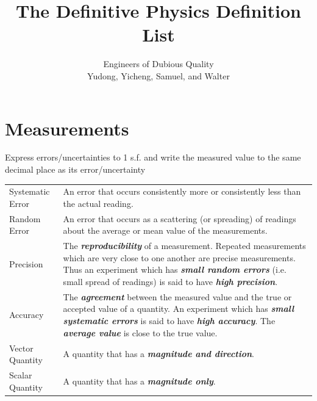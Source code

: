 \documentclass[a4paper,11pt]{article}
\title{The Definitive Physics Definition List}
\author{Engineers of Dubious Quality\\Yudong, Yicheng, Samuel, and Walter}
\begin{document}
	
	\maketitle
	
	\section{Measurements}
	Express errors/uncertainties to 1 s.f. and write the measured value to the same decimal place as its error/uncertainty
	
	\begin{center}
		\renewcommand{\arraystretch}{1.2}
		\begin{tabular}{@{} l p{11.6cm} @{}}
			\toprule
			Systematic Error & An error that occurs consistently more or consistently less than the actual reading.\\
			Random Error & An error that occurs as a scattering (or spreading) of readings about the average or mean value of the measurements. \\
			\midrule
			Precision & The \textit{\textbf{reproducibility}} of a measurement. Repeated measurements which are very close to one another are precise measurements. Thus an experiment which has \textit{\textbf{small random errors}} (i.e. small spread of readings) is said to have \textit{\textbf{high precision}}. \\
			Accuracy & The \textbf{\textit{agreement}} between the measured value and the true or accepted value of a quantity. An experiment which has \textbf{\textit{small systematic errors}} is said to have \textbf{\textit{high accuracy}}. The \textbf{\textit{average value}} is close to the true value. \\
			\midrule
			Vector Quantity & A quantity that has a \textbf{\textit{magnitude and direction}}. \\
			Scalar Quantity & A quantity that has a \textbf{\textit{magnitude only}}. \\
			\bottomrule
		\end{tabular}
	\end{center}
	
\end{document}
